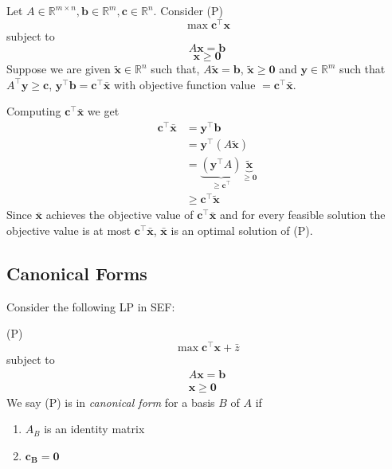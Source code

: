 Let $A\in \mathbb{R}^{m\times n}, \bm{b}\in\mathbb{R}^m, \bm{c}\in\mathbb{R}^n$.
Consider (P)
\[\max \bm{c}^\top \bm{x}\]
subject to
\[ A\bm{x}=\bm{b} \]
\[ \bm{x}\geqslant \bm{0} \]
Suppose we are given
$\bm{\tilde{x}}\in\mathbb{R}^n$ such that, $A\bm{\tilde{x}}=\bm{b}$,
$\bm{\tilde{x}}\geqslant \bm{0}$
and
$\bm{y}\in\mathbb{R}^m$ such that $A^\top \bm{y}\geqslant \bm{c}$,
$\bm{y}^\top \bm{b}=\bm{c}^\top \bm{\bar{x}}$ with objective function
value $=\bm{c}^\top \bm{\bar{x}}$.


Computing $\bm{c}^\top \bm{\bar{x}}$ we get
\begin{align*}
    \bm{c}^\top \bm{\bar{x}} & =\bm{y}^\top \bm{b}                   \\
                             & =\bm{y}^\top (A\bm{\tilde{x}})        \\
                             & =
    \underbrace{(\bm{y}^\top A)}_{\geqslant  \bm{c}^\top }
    \underbrace{\bm{\tilde{x}}}_{\geqslant  \bm{0}}                  \\
                             & \geqslant  \bm{c}^\top \bm{\tilde{x}}
\end{align*}
Since $\bm{\bar{x}}$ achieves the objective value of
$\bm{c}^\top \bm{\bar{x}}$ and for every feasible solution the objective
value is at most $\bm{c}^\top \bm{\bar{x}}$, $\bm{\bar{x}}$ is an
optimal solution of (P).

\subsection{Canonical Forms}
\begin{defbox}
    \begin{definition}
        Consider the following LP in SEF\@:

        (P)
        \[\max \bm{c}^\top  \bm{x}+\bar{z}\]
        subject to
        \begin{align*}
            A\bm{x}=\bm{b} \\
            \bm{x}\geqslant  \bm{0}
        \end{align*}
        We say (P) is in \emph{canonical form} for a basis $B$ of $A$ if
        \begin{enumerate}[label=(C\arabic*)]
            \item $A_B$ is an identity matrix
            \item $\bm{c_B}=\bm{0}$
        \end{enumerate}
    \end{definition}
\end{defbox}


